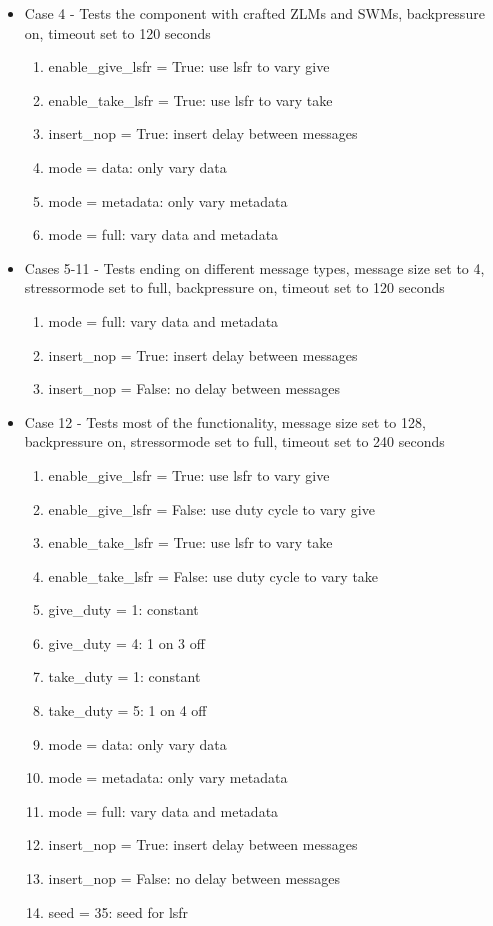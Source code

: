 \documentclass{article}
\begin{document}
\begin{flushleft}
\begin{itemize}
\item Case 4 - Tests the component with crafted ZLMs and SWMs, backpressure on, timeout set to 120 seconds
\begin{enumerate}
	\item enable\_give\_lsfr = True: use lsfr to vary give
	\item enable\_take\_lsfr = True: use lsfr to vary take
	\item insert\_nop = True: insert delay between messages
  \item mode = data: only vary data
	\item mode = metadata: only vary metadata
	\item mode = full: vary data and metadata
\end{enumerate}

\item Cases 5-11 - Tests ending on different message types, message size set to 4, stressormode set to full, backpressure on, timeout set to 120 seconds
\begin{enumerate}
	\item mode = full: vary data and metadata
	\item insert\_nop = True: insert delay between messages
	\item insert\_nop = False: no delay between messages
\end{enumerate}

\item Case 12 -  Tests most of the functionality, message size set to 128, backpressure on, stressormode set to full, timeout set to 240 seconds
\begin{enumerate}
	\item enable\_give\_lsfr = True: use lsfr to vary give
	\item enable\_give\_lsfr = False: use duty cycle to vary give
	\item enable\_take\_lsfr = True: use lsfr to vary take
	\item enable\_take\_lsfr = False: use duty cycle to vary take
	\item give\_duty = 1: constant
	\item give\_duty = 4: 1 on 3 off
	\item take\_duty = 1: constant
	\item take\_duty = 5: 1 on 4 off
	\item mode = data: only vary data
	\item mode = metadata: only vary metadata
	\item mode = full: vary data and metadata
	\item insert\_nop = True: insert delay between messages
	\item insert\_nop = False: no delay between messages
	\item seed = 35: seed for lsfr
\end{enumerate}


\end{itemize}
\end{flushleft}
\end{document}

